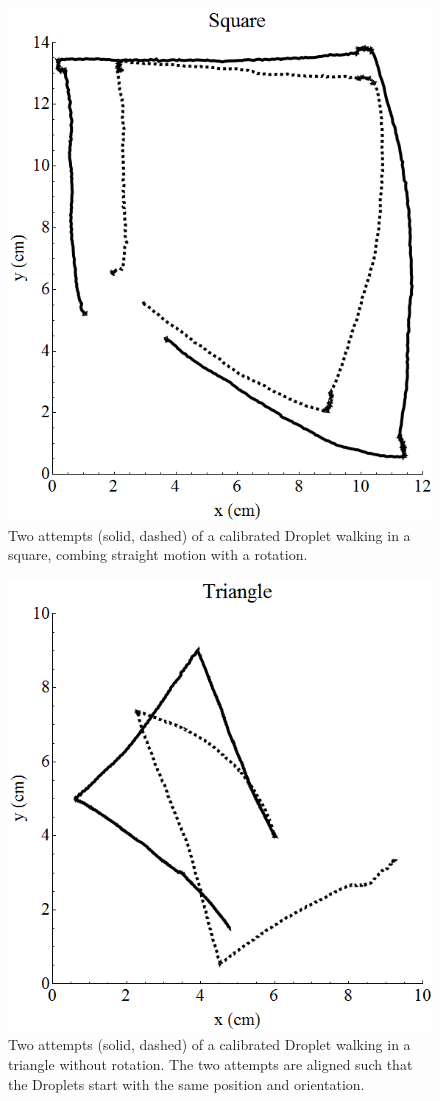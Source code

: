 \documentclass[letterpaper, 10pt, conference]{ieeeconf}
\begin{document}
\begin{figure}[htb!]
\centering
\includegraphics[width=0.9\linewidth]{Images/DropletWalksSquare}
\caption{Two attempts (solid, dashed) of a calibrated Droplet walking in a square, combing straight motion with a rotation.}
\label{fig:squareWalk}
\end{figure}
\begin{figure}[htb!]
\centering
\includegraphics[width=0.9\linewidth]{Images/DropletWalksTriangle}
\caption{Two attempts (solid, dashed) of a calibrated Droplet walking in a triangle without rotation. The two attempts are aligned such that the Droplets start with the same position and orientation.}
\label{fig:triangleWalk}
\end{figure}
\end{document}
